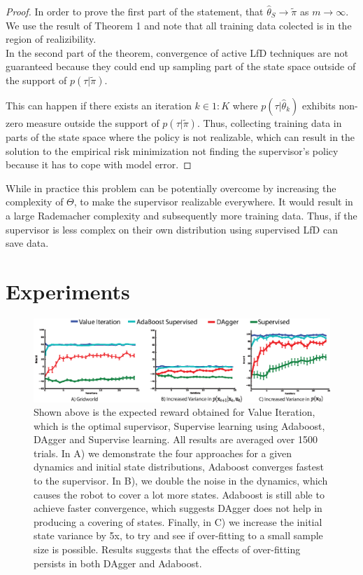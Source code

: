\documentclass[10pt, conference]{ieeeconf}      %
\begin{document}
\begin{proof}
In order to prove the first part of the statement, that $\hat{\theta}_S \rightarrow \tilde{\pi}$ as  $m \rightarrow \infty$. We  use the result of Theorem 1 and note that all training data colected is in the region of realizibility.\\ 

In the second part of the theorem, convergence of active LfD techniques are not guaranteed because they could end up sampling part of the state space outside of the support of $p(\tau|\tilde{\pi})$.

This can happen if there exists an iteration $k \in 1:K$ where $p(\tau | \hat{\theta}_k)$ exhibits non-zero measure outside the support of $p(\tau |\tilde{\pi})$. Thus, collecting training data in parts of the state space where the policy is not realizable, which can result in the solution to the empirical risk minimization not finding the supervisor's policy because it has to cope with model error. 

\end{proof}

While in practice this problem can be potentially overcome by increasing the complexity of $\Theta$, to make the supervisor realizable everywhere. It would result in a large Rademacher complexity and subsequently more training data. Thus, if the supervisor is less complex on their own distribution using supervised LfD can save data. 


\section{Experiments}


\begin{figure}
\includegraphics{f_figs/var_grid.eps}
\caption{
    \footnotesize
Shown above is the expected reward obtained for Value Iteration, which is the optimal supervisor, Supervise learning using Adaboost, DAgger and Supervise learning. All results are averaged over 1500 trials. In A) we demonstrate the four approaches for a given dynamics and initial state distributions, Adaboost converges fastest to the supervisor. In B), we double the noise in the dynamics, which causes the robot to cover a lot more states. Adaboost is still able to achieve faster convergence, which suggests DAgger does not help in producing a covering of states. Finally, in C) we increase the initial state variance by 5x, to try and see if over-fitting to a small sample size is possible. Results suggests that the effects of over-fitting persists in both DAgger and Adaboost.}
\vspace*{-20pt}
\label{fig:var}
\end{figure}
\end{document}
